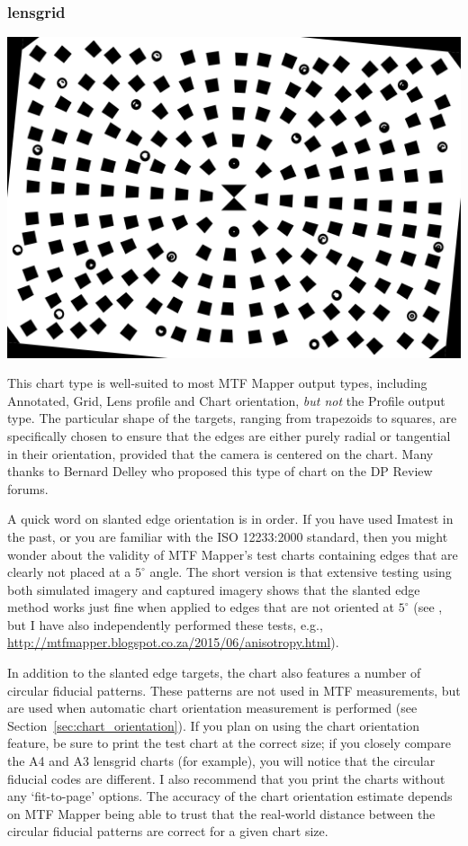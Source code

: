 \documentclass[a4paper]{article}
\begin{document}
\subsubsection{lensgrid}

\parbox{\textwidth}{
\centering
\includegraphics[width=\textwidth]{figures/chart_lensgrid}
}

\vspace{1ex}
This chart type is well-suited to most MTF Mapper output types, including
\textsf{Annotated}, \textsf{Grid}, \textsf{Lens profile} and \textsf{Chart
orientation}, \emph{but not} the \textsf{Profile} output type. The
particular shape of the targets, ranging from trapezoids to squares,
are specifically chosen to ensure that the edges are either purely radial or
tangential in their orientation, provided that the camera is centered on the
chart. Many thanks to Bernard Delley who proposed this type of chart on the
DP Review forums.

A quick word on slanted edge orientation is in order. If you have used
Imatest in the past, or you are familiar with the ISO 12233:2000 standard,
then you might wonder about the validity of MTF Mapper's test charts
containing edges that are clearly not placed at a $5^\circ$ angle. The short
version is that extensive testing using both simulated imagery and captured
imagery shows that the slanted edge method works just fine when applied to
edges that are not oriented at $5^\circ$ (see \cite{khom}, but I have also
independently performed these tests, e.g.,
\url{http://mtfmapper.blogspot.co.za/2015/06/anisotropy.html}).

In addition to the slanted edge targets, the chart also features a number of
circular fiducial patterns. These patterns are not used in MTF measurements,
but are used when automatic chart orientation measurement is performed
(see Section~\ref{sec:chart_orientation}). If you plan on using the chart
orientation feature, be sure to print the test chart at the correct size; if you closely
compare the A4 and A3 lensgrid charts (for example), you will notice that
the circular fiducial codes are different. I also recommend that you print
the charts without any `fit-to-page' options. The accuracy of the chart
orientation estimate depends on MTF Mapper being able to trust that the 
real-world distance between the circular fiducial patterns are correct for a
given chart size.
\end{document}
